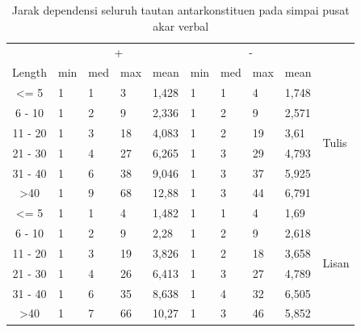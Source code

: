 \documentclass[10pt, a4paper, conference, compsocconf]{IEEEtran}
\begin{document}
\begin{table}
\begin{center}
\begin{footnotesize}
\caption{Jarak dependensi seluruh tautan antarkonstituen pada simpai pusat akar verbal}  \label{tab:deskriptif-konstituenpusat}
\begin{tabular}{c l l l l l l l l l}
\hline
 & \multicolumn{4}{c}{+} & \multicolumn{4}{c}{-} & \\  \cline{2-9}  
Length & min 	& med	& max 	& mean 	& min 	& med 	& max 	& mean 	& \\ \cline{1-10}  
\textless= 5 	& 1 		& 1 		& 3	 	& 1,428 	& 1 		& 1		& 4	 	& 1,748 	&\multirow{6}{*}{Tulis}\\
6 - 10 		& 1 		& 2		& 9	 	& 2,336 	& 1 		& 2	 	& 9	 	& 2,571 	& 	\\
11 - 20 		& 1 		& 3	 	& 18	 	& 4,083	& 1 		& 2	 	& 19	 	& 3,61 	& 	\\
21 - 30 		& 1 		& 4	 	& 27	 	& 6,265	& 1 		& 3 		& 29		& 4,793 	& 	\\ 
31 - 40 		& 1	 	& 6	 	& 38		& 9,046 	& 1 		& 3 		& 37		& 5,925 	& 	\\
\textgreater 40 	& 1	 	& 9		& 68	 	& 12,88 	& 1 		& 3 		& 44		& 6,791 	& 	\\ 
\hline
\textless= 5 	& 1 		& 1 		& 4	 	& 1,482 	& 1 		& 1	 	& 4		& 1,69 	& \multirow{6}{*}{Lisan}\\
6 - 10 		& 1 		& 2		& 9	 	& 2,28 	& 1 		& 2		& 9		& 2,618 	& \\
11 - 20 		& 1 		& 3 		& 19	 	& 3,826 	& 1 		& 2 		& 18		& 3,658 	& \\
21 - 30 		& 1	 	& 4	 	& 26	 	& 6,413	& 1 		& 3		& 27		& 4,789 	& \\ 
31 - 40 		& 1	 	& 6	 	& 35		& 8,638 	& 1 		& 4		& 32		& 6,505 	& \\
\textgreater 40 	& 1	 	& 7		& 66	 	& 10,27 	& 1	 	& 3		& 46		& 5,852 	& \\ 
\hline
   \end{tabular}
   \end{footnotesize}
\end{center}
\end{table}
\end{document}
